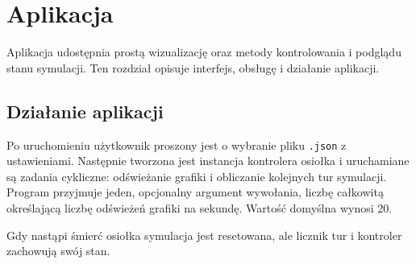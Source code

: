 

\chapter{Aplikacja}
Aplikacja udostępnia prostą wizualizację oraz metody kontrolowania i podglądu stanu symulacji. Ten rozdział opisuje interfejs, obsługę i działanie aplikacji.

\section{Działanie aplikacji}
Po uruchomieniu użytkownik proszony jest o wybranie pliku \texttt{.json} z ustawieniami. Następnie tworzona jest instancja kontrolera osiołka i uruchamiane są zadania cykliczne: odświeżanie grafiki i obliczanie kolejnych tur symulacji. Program przyjmuje jeden, opcjonalny argument wywołania, liczbę całkowitą określającą liczbę odświeżeń grafiki na sekundę. Wartość domyślna wynosi 20.

Gdy nastąpi śmierć osiołka symulacja jest resetowana, ale licznik tur i kontroler zachowują swój stan.

\clearpage

